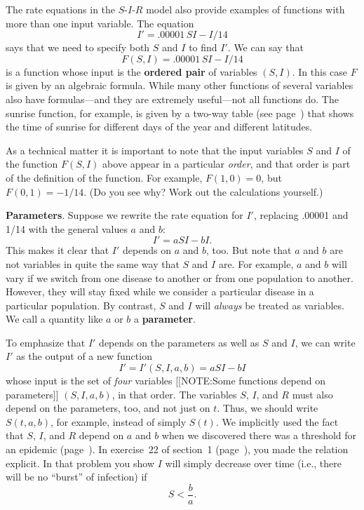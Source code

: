 The rate equations in the $S$-$I$-$R$ model also provide examples of
functions with more than one input variable.  The equation
\[
I' = .00001\,SI - I/14
\]
says that we need to specify both $S$ and $I$ to find $I'$.  We can
say that
\[
F(S, I) = .00001\,SI - I/14
\]
is a function whose input is the {\bf ordered pair} of variables $(S, I)$.  In this case $F$ is given by an
algebraic formula.  While many other functions of several variables
also have formulas---and they are extremely useful---not all functions
do.  The sunrise function, for example, is given by a two-way table
(see page~\pageref{sunrise table}) that shows the time of sunrise for
different days of the year and different latitudes.

As a technical matter it is important to note that the input variables
$S$ and $I$ of the function $F(S, I)$ above appear in a particular
{\em order}, and that order is part of the definition of the function.
For example, $F(1, 0) = 0$, but $F(0, 1) = -1/14$.  (Do you see why?
Work out the calculations yourself.)





{\bf Parameters}. Suppose we rewrite the rate
equation for $I'$, replacing .00001 and 1/14 with the general values
$a$ and $b$:
\[
I' = aSI - bI.
\]
This makes it clear that $I'$ depends on $a$ and $b$, too.  But note
that $a$ and $b$ are not variables in quite the same way that $S$ and
$I$ are.  For example, $a$ and $b$ will vary if we switch from one
disease to another or from one population to another.  However, they
will stay fixed while we consider a particular disease in a particular
population. By contrast, $S$ and $I$ will {\em always\/} be treated as
variables.  We call a quantity like $a$ or $b$ a {\bf parameter}.

To emphasize that $I'$ depends on the parameters as well as $S$ and
$I$, we can write $I'$ as the output of a new function
\[
I'= I'(S, I, a, b) = aSI - bI
\]
whose input is the set of {\em four\/} variables 
[[NOTE:Some functions  depend on parameters]]
$(S, I, a, b)$, in that order.  The variables $S$, $I$, and $R$ must
also depend on the parameters, too, and not just on $t$.  Thus, we
should write $S(t, a, b)$, for example, instead of simply $S(t)$.  We
implicitly used the fact that $S$, $I$, and $R$ depend on $a$ and $b$
when we discovered there was a threshold for an epidemic
(page~\pageref{`threshold'}).  In exercise~22 of section~1
(page~\pageref{`setthresh'}), you made the relation explicit.  In that
problem you show $I$ will simply decrease over time (i.e., there will
be no ``burst'' of infection) if
\[
S < \dfrac{b}{a}.
\]

